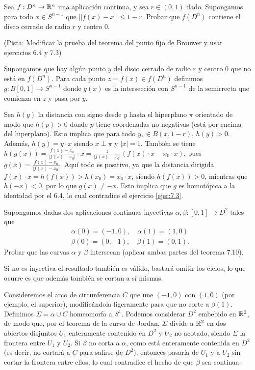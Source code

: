 \documentclass[twoside]{article}
\begin{document}
\begin{ejercicio}{7.4}
Sea $f:D^n\to\mathbb{R}^n$ una aplicación continua, y sea $r\in(0,1)$ dado. Supongamos para todo $x\in S^{n-1}$ que $||f(x)-x||\leq 1-r$. Probar que $f(D^n)$ contiene el disco cerrado de radio $r$ y centro 0.

(Pista: Modificar la prueba del teorema del punto fijo de Brouwer y usar ejercicios 6.4 y 7.3)
\end{ejercicio}
\begin{solucion}
Supongamos que hay algún punto $y$ del disco cerrado de radio $r$ y centro 0 que no está en $f(D^n)$. Para cada punto $z=f(x)\in f(D^n)$ definimos $g:B[0,1]\to S^{n-1}$ donde $g(x)$ es la intersección con $S^{n-1}$ de la semirrecta que comienza en $z$ y pasa por $y$. 

Sea $h(y)$ la distancia con signo desde $y$ hasta el hiperplano $\pi$ orientado de modo que $h(p)>0$ donde $p$ tiene coordenadas no negativas (está por encima del hiperplano). Esto implica que para todo $y,\in B(x,1-r)$, $h(y)>0$. Además, $h(y)=y\cdot x$ siendo $x\perp \pi$ y $|x|=1$.  También se tiene $h(g(x))=\frac{f(x)-x_0}{|f(x)-x_0|}\cdot x=\frac{1}{|f(x)-x_0|}(f(x)\cdot x-x_0\cdot x)$, pues $g(x)=\frac{f(x)-x_0}{|f(x)-x_0|}$. Aquí todo es positivo, ya que la distancia dirigida $f(x)\cdot x=h(f(x))>h(x_0)=x_0\cdot x$, siendo $h(f(x))>0$, mientras que $h(-x)<0$, por lo que $g(x)\neq -x$. Esto implica que $g$ es homotópica a la identidad por el 6.4, lo cual contradice el ejercicio \ref{ejer:7.3}.
\end{solucion}

\newpage

\begin{ejercicio}{7.5}
Supongamos dadas dos aplicaciones continuas inyectivas $\alpha,\beta:[0,1]\to D^2$ tales que 
\begin{align*}
&\alpha(0)=(-1,0), \quad \alpha(1)=(1,0)\\
&\beta(0)=(0,-1), \quad \beta(1)=(0,1).
\end{align*}
Probar que las curvas $\alpha$ y $\beta$ intersecan (aplicar ambas partes del teorema 7.10). 
\end{ejercicio}
\begin{solucion}
Si no es inyectiva el resultado también es válido, bastará omitir los ciclos, lo que ocurre es que además también se cortan a sí mismas.

Consideremos el arco de circunferencia $C$ que une $(-1,0)$ con $(1,0)$ (por ejemplo, el superior), modificándola ligeramente para que no corte a $\beta(1)$. Definimos $\Sigma=\alpha\cup C$ homeomorfa a $S^1$. Podemos considerar $D^2$ embebido en $\mathbb{R}^2$, de modo que, por el teorema de la curva de Jordan, $\Sigma$ divide a $\mathbb{R}^2$ en dos abiertos disjuntos $U_1$ enteramente contenido en $D^2$ y $U_2$ no acotado, siendo $\Sigma$ la frontera entre $U_1$ y $U_2$. Si $\beta$ no corta a $\alpha$, como está enteramente contenida en $D^2$ (es decir, no cortará a $C$ para salirse de $D^2$), entonces pasaría de $U_1$ y a $U_2$ sin cortar la frontera entre ellos, lo cual contradice el hecho de que $\beta$ sea continua.
\end{solucion}
\end{document}
